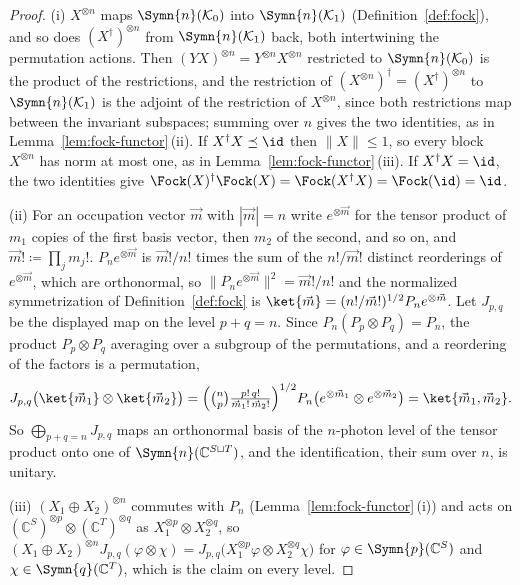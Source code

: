 \begin{proof}
(i) $X^{\otimes n}$ maps $\Symn{n}(\mathcal{K}_0)$ into
$\Symn{n}(\mathcal{K}_1)$ (Definition~\ref{def:fock}), and so does
$(X^{\dagger})^{\otimes n}$ from $\Symn{n}(\mathcal{K}_1)$ back, both
intertwining the permutation actions. Then $(YX)^{\otimes n}=Y^{\otimes n}X^{\otimes n}$
restricted to $\Symn{n}(\mathcal{K}_0)$ is the product of the restrictions,
and the restriction of $(X^{\otimes n})^{\dagger}=(X^{\dagger})^{\otimes n}$ to
$\Symn{n}(\mathcal{K}_1)$ is the adjoint of the restriction of
$X^{\otimes n}$, since both restrictions map between the invariant subspaces;
summing over $n$ gives the two identities, as in
Lemma~\ref{lem:fock-functor}\,(ii). If $X^{\dagger}X\preceq\id$ then
$\lVert X\rVert\le1$, so every block $X^{\otimes n}$ has norm at most one, as
in Lemma~\ref{lem:fock-functor}\,(iii). If $X^{\dagger}X=\id$, the two
identities give $\Fock(X)^{\dagger}\Fock(X)=\Fock(X^{\dagger}X)=\Fock(\id)=\id$.

(ii) For an occupation vector $\vec m$ with $|\vec m|=n$ write
$e^{\otimes\vec m}$ for the tensor product of $m_1$ copies of the first basis
vector, then $m_2$ of the second, and so on, and $\vec m!\coloneqq\prod_jm_j!$.
$P_ne^{\otimes\vec m}$ is $\vec m!/n!$ times the sum of the $n!/\vec m!$
distinct reorderings of $e^{\otimes\vec m}$, which are orthonormal, so
$\lVert P_ne^{\otimes\vec m}\rVert^{2}=\vec m!/n!$ and the normalized
symmetrization of Definition~\ref{def:fock} is
$\ket{\vec m}=(n!/\vec m!)^{1/2}P_ne^{\otimes\vec m}$. Let $J_{p,q}$ be the
displayed map on the level $p+q=n$. Since $P_n(P_p\otimes P_q)=P_n$, the
product $P_p\otimes P_q$ averaging over a subgroup of the permutations, and a
reordering of the factors is a permutation,
\begin{equation*}
  J_{p,q}\big(\ket{\vec m_1}\otimes\ket{\vec m_2}\big)
  =\Big(\tbinom{n}{p}\tfrac{p!\,q!}{\vec m_1!\,\vec m_2!}\Big)^{1/2}
   P_n\big(e^{\otimes\vec m_1}\otimes e^{\otimes\vec m_2}\big)
  =\ket{\vec m_1,\vec m_2}.
\end{equation*}
So $\bigoplus_{p+q=n}J_{p,q}$ maps an orthonormal basis of the $n$-photon
level of the tensor product onto one of $\Symn{n}(\mathbb{C}^{S\sqcup T})$,
and the identification, their sum over $n$, is unitary.

(iii) $(X_1\oplus X_2)^{\otimes n}$ commutes with $P_n$
(Lemma~\ref{lem:fock-functor}\,(i)) and acts on
$(\mathbb{C}^{S})^{\otimes p}\otimes(\mathbb{C}^{T})^{\otimes q}$ as
$X_1^{\otimes p}\otimes X_2^{\otimes q}$, so
$(X_1\oplus X_2)^{\otimes n}J_{p,q}(\varphi\otimes\chi)
=J_{p,q}\big(X_1^{\otimes p}\varphi\otimes X_2^{\otimes q}\chi\big)$ for
$\varphi\in\Symn{p}(\mathbb{C}^{S})$ and $\chi\in\Symn{q}(\mathbb{C}^{T})$,
which is the claim on every level.
\end{proof}

